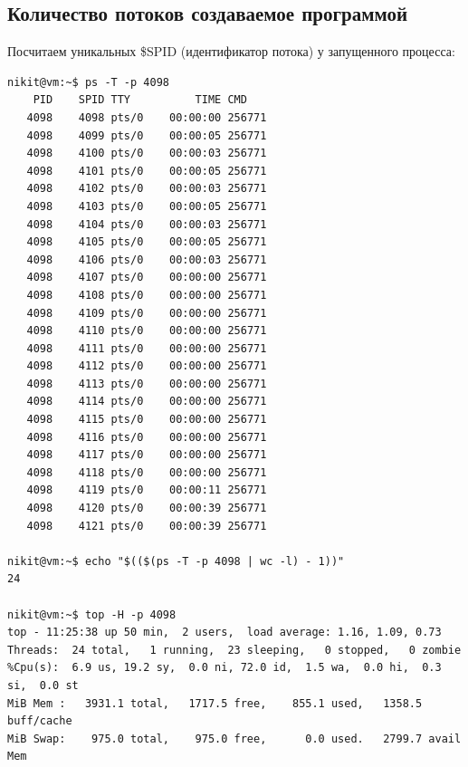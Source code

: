 \documentclass[11pt, a4paper]{article}
\begin{document}
\subsection{Количество потоков создаваемое программой}
Посчитаем уникальных \$SPID (идентификатор потока) у запущенного процесса:
\begin{Verbatim}[fontsize=\small]
nikit@vm:~$ ps -T -p 4098
    PID    SPID TTY          TIME CMD
   4098    4098 pts/0    00:00:00 256771
   4098    4099 pts/0    00:00:05 256771
   4098    4100 pts/0    00:00:03 256771
   4098    4101 pts/0    00:00:05 256771
   4098    4102 pts/0    00:00:03 256771
   4098    4103 pts/0    00:00:05 256771
   4098    4104 pts/0    00:00:03 256771
   4098    4105 pts/0    00:00:05 256771
   4098    4106 pts/0    00:00:03 256771
   4098    4107 pts/0    00:00:00 256771
   4098    4108 pts/0    00:00:00 256771
   4098    4109 pts/0    00:00:00 256771
   4098    4110 pts/0    00:00:00 256771
   4098    4111 pts/0    00:00:00 256771
   4098    4112 pts/0    00:00:00 256771
   4098    4113 pts/0    00:00:00 256771
   4098    4114 pts/0    00:00:00 256771
   4098    4115 pts/0    00:00:00 256771
   4098    4116 pts/0    00:00:00 256771
   4098    4117 pts/0    00:00:00 256771
   4098    4118 pts/0    00:00:00 256771
   4098    4119 pts/0    00:00:11 256771
   4098    4120 pts/0    00:00:39 256771
   4098    4121 pts/0    00:00:39 256771

nikit@vm:~$ echo "$(($(ps -T -p 4098 | wc -l) - 1))"
24

nikit@vm:~$ top -H -p 4098
top - 11:25:38 up 50 min,  2 users,  load average: 1.16, 1.09, 0.73
Threads:  24 total,   1 running,  23 sleeping,   0 stopped,   0 zombie
%Cpu(s):  6.9 us, 19.2 sy,  0.0 ni, 72.0 id,  1.5 wa,  0.0 hi,  0.3 si,  0.0 st
MiB Mem :   3931.1 total,   1717.5 free,    855.1 used,   1358.5 buff/cache
MiB Swap:    975.0 total,    975.0 free,      0.0 used.   2799.7 avail Mem


\end{Verbatim}
\end{document}
